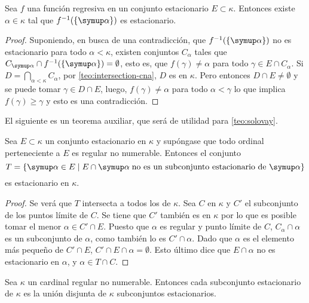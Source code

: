 \documentclass
[
  12pt,
  letterpaper,
  openany,
  oneside,
]{book}
\begin{document}
\begin{teo}[Fodor]\label{teo:fodor}
    Sea $f$ una función regresiva en un conjunto estacionario $E\subset\kappa$.
    Entonces existe $\alpha\in\kappa$ tal que $f^{-1}(\set{\alpha})$ es estacionario.
\end{teo}

\begin{proof}
    Suponiendo, en busca de una contradicción, que $f^{-1}(\set{\alpha})$ no es estacionario
    para todo $\alpha<\kappa$, existen conjuntos \cna{} $C_\alpha$ tales que
    $C_\alpha\cap f^{-1}(\set{\alpha}) = \emptyset$, esto es,
    que $f(\gamma)\neq\alpha$ para todo $\gamma\in E\cap C_\alpha$.
    Si $D=\dint_{\alpha<\kappa} C_\alpha$,
    por \ref{teo:intersection-cna}, $D$ es \cna{} en $\kappa$.
    Pero entonces $D\cap E\neq\emptyset$ y se puede tomar $\gamma\in D\cap E$,
    luego, $f(\gamma)\neq\alpha$ para todo $\alpha<\gamma$
    lo que implica $f(\gamma)\geq\gamma$ y esto es una contradicción.
\end{proof}

El siguiente es un teorema auxiliar, que será de utilidad para \ref{teo:solovay}.

\begin{teo}\label{teo:stationary}
    Sea $E\subset\kappa$ un conjunto estacionario en $\kappa$ y supóngase que todo
    ordinal perteneciente a $E$ es regular no numerable. Entonces el conjunto
    \[
        T=\set{\alpha\in E\mid
            E\cap\alpha\;\text{no es un subconjunto estacionario de $\alpha$}}
    \]
    es estacionario en $\kappa$.
\end{teo}

\begin{proof}
    Se verá que $T$ intersecta a todos los \cna{} de $\kappa$.
    Sea $C$ \cna{} en $\kappa$ y $C'$ el subconjunto de los puntos límite de $C$.
    Se tiene que $C'$ también es \cna{} en $\kappa$ por lo que es posible tomar
    el menor $\alpha\in C'\cap E$.
    Puesto que $\alpha$ es regular y punto límite de $C$, $C_\alpha\cap\alpha$ es un subconjunto
    \cna{} de $\alpha$, como también lo es $C'\cap\alpha$. Dado que $\alpha$ es el elemento
    más pequeño de $C'\cap E$, $C'\cap E\cap\alpha = \emptyset$. Esto último
    dice que $E\cap\alpha$ no es estacionario en $\alpha$, y $\alpha\in T\cap C$.
\end{proof}

\begin{teo}[Solovay]\label{teo:solovay}
    Sea $\kappa$ un cardinal regular no numerable. Entonces cada subconjunto estacionario
    de $\kappa$ es la unión disjunta de $\kappa$ subconjuntos estacionarios.
\end{teo}
\end{document}
